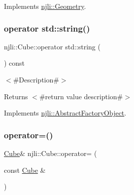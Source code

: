 Implements \mbox{\hyperlink{classnjli_1_1_geometry_a27b42b7a7ed3c67a6f8827288828687a}{njli\+::\+Geometry}}.

\mbox{\label{classnjli_1_1_cube_a1a9b42b50049c387b60043debda45961}} 
\subsubsection{\texorpdfstring{operator std\+::string()}{operator std::string()}}
{\footnotesize\ttfamily njli\+::\+Cube\+::operator std\+::string (\begin{DoxyParamCaption}{ }\end{DoxyParamCaption}) const\hspace{0.3cm}{\ttfamily [virtual]}}

$<$\#\+Description\#$>$

\begin{DoxyReturn}{Returns}
$<$\#return value description\#$>$ 
\end{DoxyReturn}


Implements \mbox{\hyperlink{classnjli_1_1_abstract_factory_object_a838f4fa7e65cace6098aab5222892942}{njli\+::\+Abstract\+Factory\+Object}}.

\mbox{\label{classnjli_1_1_cube_a58e0e6d84676354a1cb2198194495a8a}} 
\subsubsection{\texorpdfstring{operator=()}{operator=()}}
{\footnotesize\ttfamily \mbox{\hyperlink{classnjli_1_1_cube}{Cube}}\& njli\+::\+Cube\+::operator= (\begin{DoxyParamCaption}\item[{const \mbox{\hyperlink{classnjli_1_1_cube}{Cube}} \&}]{ }\end{DoxyParamCaption})\hspace{0.3cm}{\ttfamily [protected]}}

\mbox{\label{classnjli_1_1_cube_a00652e991c099a535207194c73324c65}} 
